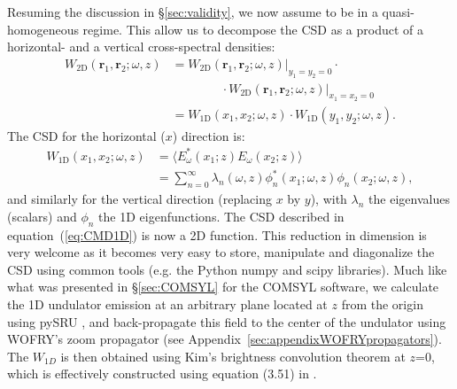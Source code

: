 \documentclass{iucr}              %
\begin{document}
Resuming the discussion in \S\ref{sec:validity}, we now assume to be in a quasi-homogeneous regime. This allow us to decompose the CSD as a product of a horizontal- and a vertical cross-spectral densities:
\begin{equation}\label{eq:CSD_2D_bis}
\begin{split}
W_\text{2D}(\textbf{r}_1,\textbf{r}_2;\omega,z) &= W_\text{2D}(\textbf{r}_1,\textbf{r}_2;\omega,z)\Big\rvert_{y_1=y_2=0} \cdot \\& \qquad\qquad\cdot W_\text{2D}(\textbf{r}_1,\textbf{r}_2;\omega,z)\Big\rvert_{x_1=x_2=0}\\
&= W_\text{1D}(x_1,x_2;\omega,z)\cdot W_\text{1D}(y_1,y_2;\omega,z).
\end{split}
\end{equation}
The CSD for the horizontal ($x$) direction is:
\begin{equation}\begin{split}
W_\text{1D}(x_1,x_2;\omega,z) &= \big\langle E^*_{\omega}(x_1;z) E_{\omega}(x_2;z)\big\rangle \\&=  \sum_{n=0}^{\infty} \lambda_n(\omega,z) \phi_n^*(x_1;\omega,z) \phi_n(x_2;\omega,z), 
\end{split}\label{eq:CMD1D}
\end{equation}
and similarly for the vertical direction (replacing $x$ by $y$), 
with $\lambda_n$ the eigenvalues (scalars) and $\phi_n$ the 1D eigenfunctions. The CSD described in equation~(\ref{eq:CMD1D}) is now a 2D function. This reduction in dimension is very welcome as it becomes very easy to store, manipulate and diagonalize the CSD using common tools (e.g. the Python numpy and scipy libraries). Much like what was presented in \S\ref{sec:COMSYL} for the COMSYL software,  we calculate the 1D undulator emission at an arbitrary plane located at $z$ from the origin using pySRU \cite{pySRU}, and back-propagate this field  to the center of the undulator using WOFRY's zoom propagator (see Appendix~\ref{sec:appendixWOFRYpropagators}). The $W_{1D}$ is then obtained using Kim's brightness convolution theorem at $z$=0, which is effectively constructed using equation (3.51) in \cite{glassThesis}.
\end{document}
